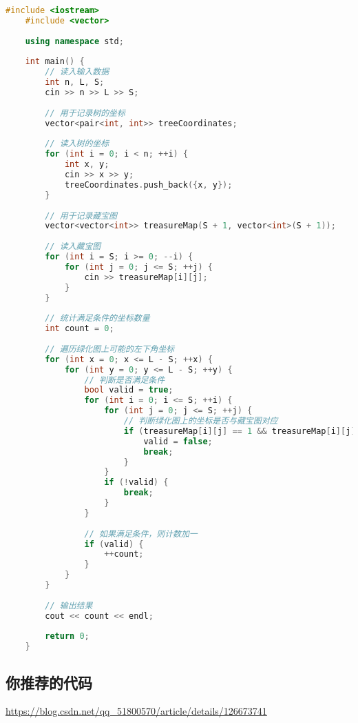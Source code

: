 \begin{lstlisting}[language=C++]
    #include <iostream>
    #include <vector>
    
    using namespace std;
    
    int main() {
        // 读入输入数据
        int n, L, S;
        cin >> n >> L >> S;
    
        // 用于记录树的坐标
        vector<pair<int, int>> treeCoordinates;
    
        // 读入树的坐标
        for (int i = 0; i < n; ++i) {
            int x, y;
            cin >> x >> y;
            treeCoordinates.push_back({x, y});
        }
    
        // 用于记录藏宝图
        vector<vector<int>> treasureMap(S + 1, vector<int>(S + 1));
    
        // 读入藏宝图
        for (int i = S; i >= 0; --i) {
            for (int j = 0; j <= S; ++j) {
                cin >> treasureMap[i][j];
            }
        }
    
        // 统计满足条件的坐标数量
        int count = 0;
    
        // 遍历绿化图上可能的左下角坐标
        for (int x = 0; x <= L - S; ++x) {
            for (int y = 0; y <= L - S; ++y) {
                // 判断是否满足条件
                bool valid = true;
                for (int i = 0; i <= S; ++i) {
                    for (int j = 0; j <= S; ++j) {
                        // 判断绿化图上的坐标是否与藏宝图对应
                        if (treasureMap[i][j] == 1 && treasureMap[i][j] != treeCoordinates[x + i].second) {
                            valid = false;
                            break;
                        }
                    }
                    if (!valid) {
                        break;
                    }
                }
    
                // 如果满足条件，则计数加一
                if (valid) {
                    ++count;
                }
            }
        }
    
        // 输出结果
        cout << count << endl;
    
        return 0;
    }    
\end{lstlisting}

\subsection{你推荐的代码}

\href{202206-2 寻宝！大冒险！}{https://blog.csdn.net/qq\_51800570/article/details/126673741}

